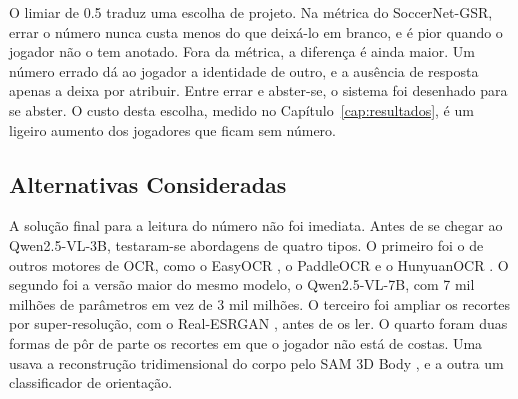 O limiar de 0.5 traduz uma escolha de projeto. Na métrica do SoccerNet-GSR, errar o número nunca custa menos do que deixá-lo em branco, e é pior quando o jogador não o tem anotado. Fora da métrica, a diferença é ainda maior. Um número errado dá ao jogador a identidade de outro, e a ausência de resposta apenas a deixa por atribuir. Entre errar e abster-se, o sistema foi desenhado para se abster. O custo desta escolha, medido no Capítulo~\ref{cap:resultados}, é um ligeiro aumento dos jogadores que ficam sem número.


\subsection{Alternativas Consideradas}

A solução final para a leitura do número não foi imediata. Antes de se chegar ao Qwen2.5-VL-3B, testaram-se abordagens de quatro tipos. O primeiro foi o de outros motores de OCR, como o EasyOCR \citep{jaidedai2020easyocr}, o PaddleOCR \citep{li2022ppocrv3} e o HunyuanOCR \citep{hunyuan2025ocr}. O segundo foi a versão maior do mesmo modelo, o Qwen2.5-VL-7B, com 7 mil milhões de parâmetros em vez de 3 mil milhões. O terceiro foi ampliar os recortes por super-resolução, com o Real-ESRGAN \citep{wang2021realesrgan}, antes de os ler. O quarto foram duas formas de pôr de parte os recortes em que o jogador não está de costas. Uma usava a reconstrução tridimensional do corpo pelo SAM 3D Body \citep{yang2026sam3dbody}, e a outra um classificador de orientação.

